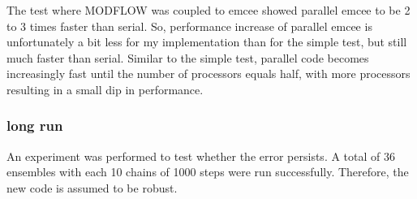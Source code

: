 The test where MODFLOW was coupled to emcee showed parallel emcee to be 2 to 3 times faster than serial. So, performance increase of parallel emcee is unfortunately a bit less for my implementation than for the simple test, but still much faster than serial. Similar to the simple test, parallel code becomes increasingly fast until the number of processors equals half, with more processors resulting in a small dip in performance. 

\subsubsection{long run}
An experiment was performed to test whether the error persists. A total of 36 ensembles with each 10 chains of 1000 steps were run successfully. Therefore, the new code is assumed to be robust.%